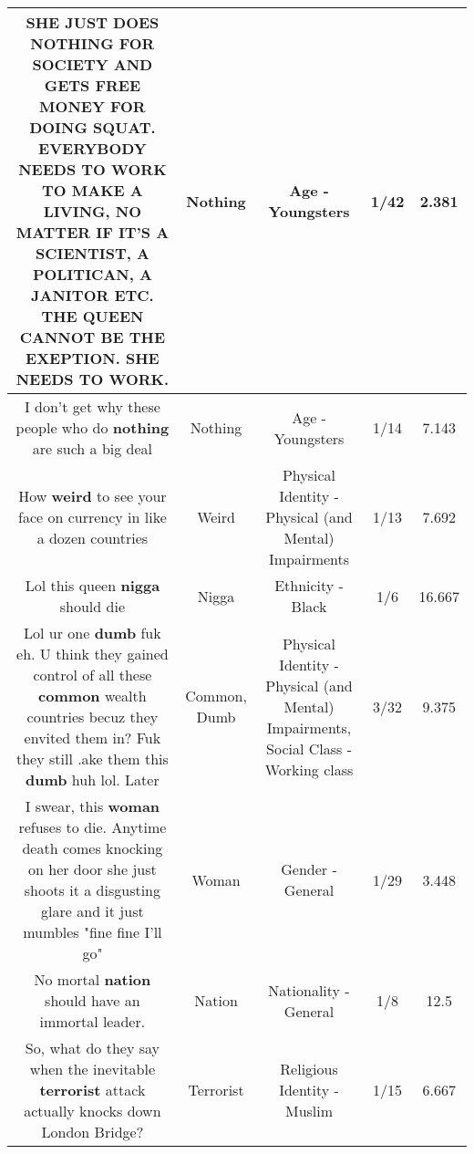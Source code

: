 \documentclass[11pt]{article}
\newlength\mylength
\begin{document}
\begin{center}
\begin{longtable}{|C{.65\mylength}|C{.30\mylength}|C{.12\mylength}|C{.12\mylength}|C{.12\mylength}|}
  \small SHE JUST DOES \textbf{NOTHING} FOR SOCIETY AND GETS FREE MONEY FOR DOING SQUAT.  EVERYBODY NEEDS TO WORK TO MAKE A LIVING, NO MATTER IF IT'S A SCIENTIST, A POLITICAN, A JANITOR ETC.  THE QUEEN CANNOT BE THE EXEPTION.  SHE NEEDS TO WORK.\normalsize   & Nothing & Age - Youngsters & 1/42 & 2.381 \\  \hline
  \small I don't get why these people who do \textbf{nothing} are such a big deal\normalsize   & Nothing & Age - Youngsters & 1/14 & 7.143 \\  \hline
  \small How \textbf{weird} to see your face on currency in like a dozen countries\normalsize   & Weird & Physical Identity - Physical (and Mental) Impairments & 1/13 & 7.692 \\  \hline
  \small Lol this queen \textbf{nigga} should die\normalsize   & Nigga & Ethnicity - Black & 1/6 & 16.667 \\  \hline
  \small Lol ur one \textbf{dumb} fuk eh. U think they gained control of all these \textbf{common} wealth countries becuz they envited them in?  Fuk they still .ake them this \textbf{dumb} huh lol. Later\normalsize   & Common, Dumb & Physical Identity - Physical (and Mental) Impairments, Social Class - Working class & 3/32 & 9.375 \\  \hline
  \small I swear, this \textbf{woman} refuses to die. Anytime death comes knocking on her door she just shoots it a disgusting glare and it just mumbles "fine fine I'll go"\normalsize   & Woman & Gender - General & 1/29 & 3.448 \\  \hline
  \small No mortal \textbf{nation} should have an immortal leader.\normalsize   & Nation & Nationality - General & 1/8 & 12.5 \\  \hline
  \small So, what do they say when the inevitable \textbf{terrorist} attack actually knocks down London Bridge?\normalsize   & Terrorist & Religious Identity - Muslim & 1/15 & 6.667 \\  \hline

\end{longtable}
\end{center}
\end{document}
